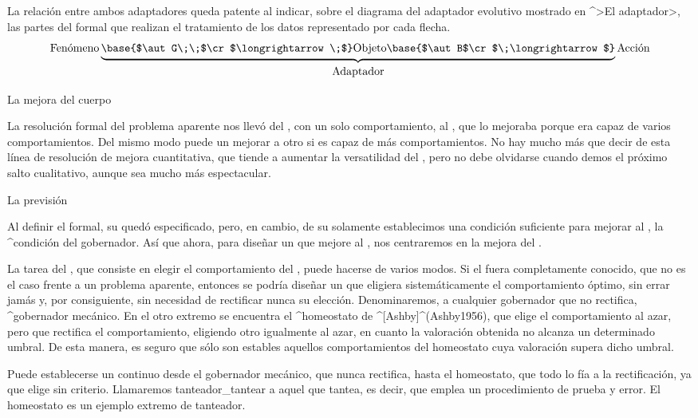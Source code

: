 La relación entre ambos adaptadores queda patente al indicar, sobre el
diagrama del adaptador evolutivo mostrado en ^>El adaptador>, las partes
del {\adaptador} formal que realizan el tratamiento de los datos
representado por cada flecha.
$$\hbox{Fenómeno}
  \underbrace{
   \base{$\aut G\;\;$\cr$\longrightarrow\;$}
   \hbox{\strut Objeto}
   \base{$\aut B$\cr$\;\longrightarrow$}}_{\hbox{\strut Adaptador}}
  \hbox{Acción}
$$

\kern-12pt

\Section La mejora del cuerpo

La resolución formal del problema aparente nos llevó del {\mecanismo},
con un solo comportamiento, al {\adaptador}, que lo mejoraba porque era
capaz de varios comportamientos. Del mismo modo puede un {\adaptador}
mejorar a otro si es capaz de más comportamientos. No hay mucho más que
decir de esta línea de resolución de mejora cuantitativa, que tiende a
aumentar la versatilidad del {\cuerpo}, pero no debe olvidarse cuando
demos el próximo salto cualitativo, aunque sea mucho más espectacular.


\Section La previsión

Al definir el {\adaptador} formal, su {\cuerpo} quedó especificado,
pero, en cambio, de su {\gobernador} solamente establecimos una
condición suficiente para mejorar al {\mecanismo}, la ^{condición del
gobernador}. Así que ahora, para diseñar un {\aprendiz} que mejore al
{\adaptador}, nos centraremos en la mejora del {\gobernador}.

La tarea del {\gobernador}, que consiste en elegir el comportamiento del
{\cuerpo}, puede hacerse de varios modos. Si el {\universo} fuera
completamente conocido, que no es el caso frente a un problema aparente,
entonces se podría diseñar un {\gobernador} que eligiera
sistemáticamente el comportamiento óptimo, sin errar jamás y, por
consiguiente, sin necesidad de rectificar nunca su elección.
Denominaremos, a cualquier gobernador que no rectifica, ^{gobernador
mecánico}. En el otro extremo se encuentra el ^{homeostato} de
^[Ashby]^(Ashby1956), que elige el comportamiento al azar, pero que
rectifica el comportamiento, eligiendo otro igualmente al azar, en
cuanto la valoración obtenida no alcanza un determinado umbral. De esta
manera, es seguro que sólo son estables aquellos comportamientos del
homeostato cuya valoración supera dicho umbral.

Puede establecerse un continuo desde el gobernador mecánico, que nunca
rectifica, hasta el homeostato, que todo lo fía a la rectificación, ya
que elige sin criterio. Llamaremos tanteador_{tantear} a aquel
{\gobernador} que tantea, es decir, que emplea un procedimiento de
prueba y error. El homeostato es un ejemplo extremo de tanteador.


